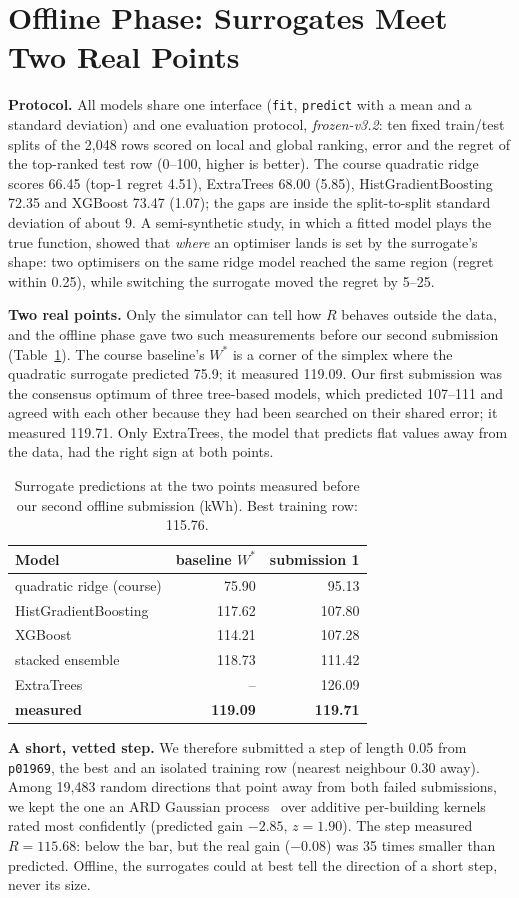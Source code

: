 \section{Offline Phase: Surrogates Meet Two Real Points}
\label{sec:offline}
\textbf{Protocol.} All models share one interface (\texttt{fit}, \texttt{predict} with a mean and a standard
deviation) and one evaluation protocol, \emph{frozen-v3.2}: ten fixed train/test splits of the 2,048 rows scored on
local and global ranking, error and the regret of the top-ranked test row (0--100, higher is better). The course
quadratic ridge scores 66.45 (top-1 regret 4.51), ExtraTrees 68.00 (5.85), HistGradientBoosting 72.35 and XGBoost 73.47
(1.07); the gaps are inside the split-to-split standard deviation of about 9. A semi-synthetic study, in which a fitted
model plays the true function, showed that \emph{where} an optimiser lands is set by the surrogate's shape: two
optimisers on the same ridge model reached the same region (regret within 0.25), while switching the surrogate moved the
regret by 5--25.

\textbf{Two real points.} Only the simulator can tell how $R$ behaves outside the data, and the offline phase gave two
such measurements before our second submission (Table~\ref{tab:offline}). The course baseline's $W^\ast$ is a corner of
the simplex where the quadratic surrogate predicted 75.9; it measured 119.09. Our first submission was the consensus
optimum of three tree-based models, which predicted 107--111 and agreed with each other because they had been searched
on their shared error; it measured 119.71. Only ExtraTrees, the model that predicts flat values away from the data, had
the right sign at both points.

\begin{table}[t]
\centering
\caption{Surrogate predictions at the two points measured before our second offline submission (kWh). Best training
row: 115.76.}
\label{tab:offline}
\begin{tabular}{lrr}
\toprule
Model & baseline $W^\ast$ & submission 1\\
\midrule
quadratic ridge (course) & 75.90 & 95.13\\
HistGradientBoosting & 117.62 & 107.80\\
XGBoost & 114.21 & 107.28\\
stacked ensemble & 118.73 & 111.42\\
ExtraTrees & -- & 126.09\\
\midrule
\textbf{measured} & \textbf{119.09} & \textbf{119.71}\\
\bottomrule
\end{tabular}
\end{table}

\textbf{A short, vetted step.} We therefore submitted a step of length 0.05 from \texttt{p01969}, the best and an
isolated training row (nearest neighbour 0.30 away). Among 19,483 random directions that point away from both failed
submissions, we kept the one an ARD Gaussian process~\cite{rasmussen} over additive per-building kernels rated most
confidently (predicted gain $-2.85$, $z=1.90$). The step measured $R=115.68$: below the bar, but the real gain ($-0.08$)
was 35 times smaller than predicted. Offline, the surrogates could at best tell the direction of a short step, never its
size.
